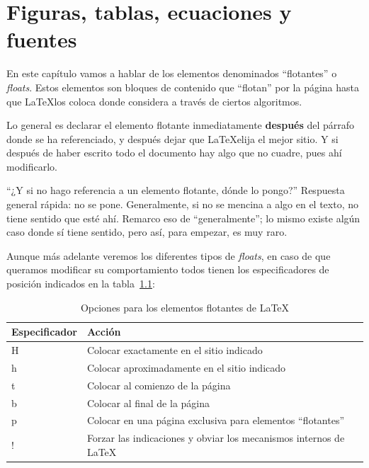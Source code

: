 \chapter{Figuras, tablas, ecuaciones y fuentes}

En este capítulo vamos a hablar de los elementos denominados \enquote{flotantes} o \textit{floats}. Estos elementos son bloques de contenido que ``flotan'' por la página hasta que \LaTeX\space los coloca donde considera a través de ciertos algoritmos.

Lo general es declarar el elemento flotante inmediatamente \textbf{después} del párrafo donde se ha referenciado, y después dejar que \LaTeX\space elija el mejor sitio. Y si después de haber escrito todo el documento hay algo que no cuadre, pues ahí modificarlo.

\enquote{¿Y si no hago referencia a un elemento flotante, dónde lo pongo?} Respuesta general rápida: no se pone. Generalmente, si no se mencina a algo en el texto, no tiene sentido que esté ahí. Remarco eso de \enquote{generalmente}; lo mismo existe algún caso donde sí tiene sentido, pero así, para empezar, es muy raro.

Aunque más adelante veremos los diferentes tipos de \textit{floats}, en caso de que queramos modificar su comportamiento todos tienen los especificadores de posición indicados en la tabla~\ref{tab:floats-options}:

\begin{table}
    \caption{\label{tab:floats-options}Opciones para los elementos flotantes de \LaTeX}
    \centering
    \begin{tabularx}{\textwidth}{@{}lX@{}}
        \toprule
        \textbf{Especificador} & \textbf{Acción} \\
        \midrule
        H & Colocar exactamente en el sitio indicado                           \\
        h & Colocar aproximadamente en el sitio indicado                       \\
        t & Colocar al comienzo de la página                                   \\
        b & Colocar al final de la página                                      \\
        p & Colocar en una página exclusiva para elementos ``flotantes''       \\
        ! & Forzar las indicaciones y obviar los mecanismos internos de \LaTeX \\
    \bottomrule
    \end{tabularx}
\end{table}

